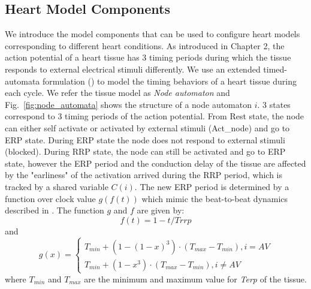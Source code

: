 \documentclass[openany]{now} %
\newcommand{\figref}[1]{Fig.~\ref{fig:#1}}
\begin{document}
\subsection{Heart Model Components}
We introduce the model components that can be used to configure heart models corresponding to different heart conditions. As introduced in Chapter 2, the action potential of a heart tissue has 3 timing periods during which the tissue responds to external electrical stimuli differently. We use an extended timed-automata formulation (\cite{timed_automata}) to model the timing behaviors of a heart tissue during each cycle. We refer the tissue model as \emph{Node automaton} and \figref{node_automata} shows the structure of a node automaton $i$. 3 states correspond to 3 timing periods of the action potential. From \textsf{Rest} state, the node can either self activate or activated by external stimuli (Act\_node) and go to \textsf{ERP} state. During \textsf{ERP} state the node does not respond to external stimuli (blocked). During \textsf{RRP} state, the node can still be activated and go to \textsf{ERP} state, however the ERP period and the conduction delay of the tissue are affected by the "earliness" of the activation arrived during the RRP period, which is tracked by a shared variable $C(i)$. The new ERP period is determined by a function over clock value $g(f(t))$ which mimic the beat-to-beat dynamics described in \cite{josephson}. The function $g$ and $f$ are given by:
\begin{equation} \label{factor}
						f(t) = 1-t/Trrp
						\end{equation}
and
\begin{equation} \label{earliness_noAV}
						g(x) = \left\{
						\begin{array}{lr}
						
						T_{min}+(1-(1-x)^3)\cdot (T_{max}-T_{min}), i=AV\\
						T_{min}+(1-x^3)\cdot (T_{max}-T_{min}),i\neq AV
			
						
						\end{array}
						\right.
						\end{equation}  
where $T_{min}$ and $T_{max}$ are the minimum and maximum value for \emph{Terp} of the tissue.
\end{document}
